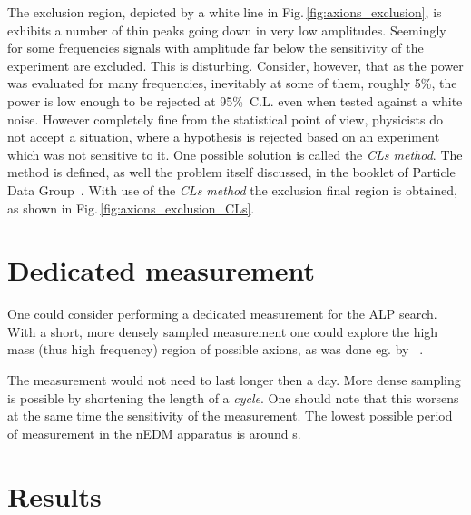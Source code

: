 The exclusion region, depicted by a white line in Fig.\,\ref{fig:axions_exclusion}, is exhibits a number of thin peaks going down in very low amplitudes. Seemingly for some frequencies signals with amplitude far below the sensitivity of the experiment are excluded. This is disturbing. Consider, however, that as the power was evaluated for many frequencies, inevitably at some of them, roughly 5\%, the power is low enough to be rejected at 95\%~C.L. even when tested against a white noise. However completely fine from the statistical point of view, physicists do not accept a situation, where a hypothesis is rejected based on an experiment which was not sensitive to it. One possible solution is called the \emph{CLs method}. The method is defined, as well the problem itself discussed, in the booklet of Particle Data Group~\citep{Group2014}. With use of the \emph{CLs method} the exclusion final region is obtained, as shown in Fig.\,\ref{fig:axions_exclusion_CLs}.


\section{Dedicated measurement}
One could consider performing a dedicated measurement for the ALP search. With a short, more densely sampled measurement one could explore the high mass (thus high frequency) region of possible axions, as was done eg. by \citeauthor{VanTilburg2015}~\citep{VanTilburg2015}.

The measurement would not need to last longer then a day. More dense sampling is possible by shortening the length of a \emph{cycle}. One should note that this worsens at the same time the sensitivity of the measurement. The lowest possible period of measurement in the nEDM apparatus is around \unit[100]{s}.

\section{Results}
